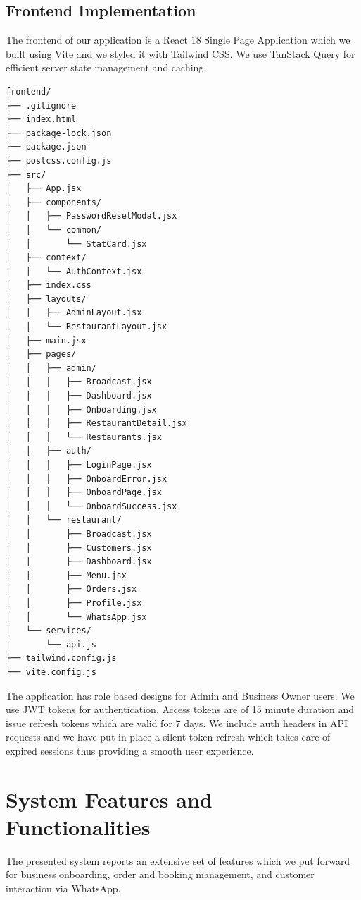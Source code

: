 \subsection{Frontend Implementation}

The frontend of our application is a React 18 Single Page Application which we built using Vite and we styled it with Tailwind CSS. We use TanStack Query for efficient server state management and caching.

\begin{lstlisting}[caption=Frontend Directory Structure, captionpos=b]
frontend/
├── .gitignore
├── index.html
├── package-lock.json
├── package.json
├── postcss.config.js
├── src/
│   ├── App.jsx
│   ├── components/
│   │   ├── PasswordResetModal.jsx
│   │   └── common/
│   │       └── StatCard.jsx
│   ├── context/
│   │   └── AuthContext.jsx
│   ├── index.css
│   ├── layouts/
│   │   ├── AdminLayout.jsx
│   │   └── RestaurantLayout.jsx
│   ├── main.jsx
│   ├── pages/
│   │   ├── admin/
│   │   │   ├── Broadcast.jsx
│   │   │   ├── Dashboard.jsx
│   │   │   ├── Onboarding.jsx
│   │   │   ├── RestaurantDetail.jsx
│   │   │   └── Restaurants.jsx
│   │   ├── auth/
│   │   │   ├── LoginPage.jsx
│   │   │   ├── OnboardError.jsx
│   │   │   ├── OnboardPage.jsx
│   │   │   └── OnboardSuccess.jsx
│   │   └── restaurant/
│   │       ├── Broadcast.jsx
│   │       ├── Customers.jsx
│   │       ├── Dashboard.jsx
│   │       ├── Menu.jsx
│   │       ├── Orders.jsx
│   │       ├── Profile.jsx
│   │       └── WhatsApp.jsx
│   └── services/
│       └── api.js
├── tailwind.config.js
└── vite.config.js

\end{lstlisting}

The application has role based designs for Admin and Business Owner users. We use JWT tokens for authentication. Access tokens are of 15 minute duration and issue refresh tokens which are valid for 7 days. We include auth headers in API requests and we have put in place a silent token refresh which takes care of expired sessions thus providing a smooth user experience.


\section{System Features and Functionalities}

The presented system reports an extensive set of features which we put forward for business onboarding, order and booking management, and customer interaction via WhatsApp.

